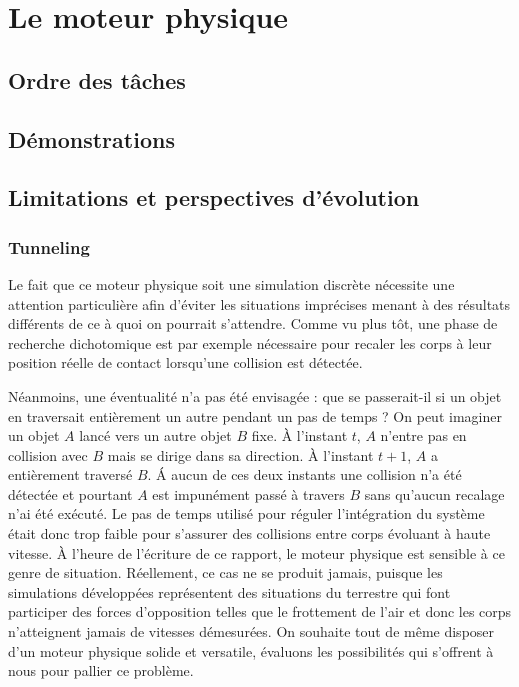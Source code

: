 \section{Le moteur physique}

\subsection{Ordre des tâches}

\subsection{Démonstrations}

\subsection{Limitations et perspectives d'évolution}

\subsubsection{Tunneling}

Le fait que ce moteur physique soit une simulation discrète nécessite une attention particulière afin d'éviter les situations imprécises menant à des résultats différents de ce à quoi on pourrait s'attendre. Comme vu plus tôt, une phase de recherche dichotomique est par exemple nécessaire pour recaler les corps à leur position réelle de contact lorsqu'une collision est détectée.

Néanmoins, une éventualité n'a pas été envisagée : que se passerait-il si un objet en traversait entièrement un autre pendant un pas de temps ? On peut imaginer un objet $A$ lancé vers un autre objet $B$ fixe. \`A l'instant $t$, $A$ n'entre pas en collision avec $B$ mais se dirige dans sa direction. \`A l'instant $t+1$, $A$ a entièrement traversé $B$. \'A aucun de ces deux instants une collision n'a été détectée et pourtant $A$ est impunément passé à travers $B$ sans qu'aucun recalage n'ai été exécuté. Le pas de temps utilisé pour réguler l'intégration du système était donc trop faible pour s'assurer des collisions entre corps évoluant à haute vitesse. \`A l'heure de l'écriture de ce rapport, le moteur physique est sensible à ce genre de situation. Réellement, ce cas ne se produit jamais, puisque les simulations développées représentent des situations du terrestre qui font participer des forces d'opposition telles que le frottement de l'air et donc les corps n'atteignent jamais de vitesses démesurées. On souhaite tout de même disposer d'un moteur physique solide et versatile, évaluons les possibilités qui s'offrent à nous pour pallier ce problème.

